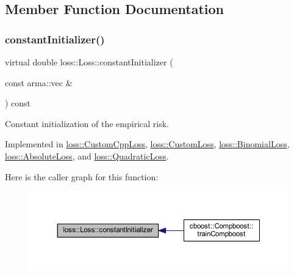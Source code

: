 \subsection{Member Function Documentation}
\mbox{\label{classloss_1_1_loss_a65fe7dcd9370e6a549b8d1cc95fc8798}} 
\subsubsection{\texorpdfstring{constant\+Initializer()}{constantInitializer()}}
{\footnotesize\ttfamily virtual double loss\+::\+Loss\+::constant\+Initializer (\begin{DoxyParamCaption}\item[{const arma\+::vec \&}]{ }\end{DoxyParamCaption}) const\hspace{0.3cm}{\ttfamily [pure virtual]}}



Constant initialization of the empirical risk. 



Implemented in \mbox{\hyperlink{classloss_1_1_custom_cpp_loss_a7e3691161855a4a3152982274e74c96a}{loss\+::\+Custom\+Cpp\+Loss}}, \mbox{\hyperlink{classloss_1_1_custom_loss_adf283025a8511731504cd5b620cc8b37}{loss\+::\+Custom\+Loss}}, \mbox{\hyperlink{classloss_1_1_binomial_loss_a1292422a2b07c8ebe1b168375940b029}{loss\+::\+Binomial\+Loss}}, \mbox{\hyperlink{classloss_1_1_absolute_loss_aa2ac5fb1fdf3ce0f48decd77d375ef76}{loss\+::\+Absolute\+Loss}}, and \mbox{\hyperlink{classloss_1_1_quadratic_loss_a43989f3fbecc27351513afe1136cdf38}{loss\+::\+Quadratic\+Loss}}.

Here is the caller graph for this function\+:\nopagebreak
\begin{figure}[H]
\begin{center}
\leavevmode
\includegraphics[width=350pt]{classloss_1_1_loss_a65fe7dcd9370e6a549b8d1cc95fc8798_icgraph}
\end{center}
\end{figure}
\mbox{\label{classloss_1_1_loss_a267a4de70747ade4b2d84ce35a448979}} 
